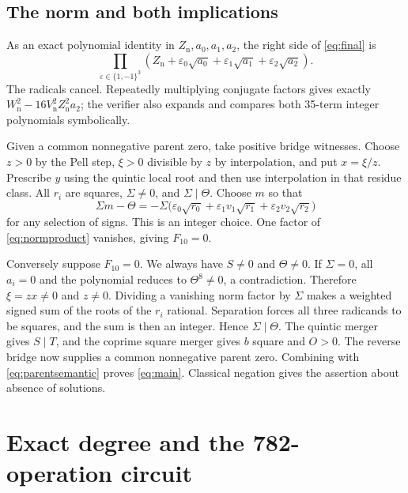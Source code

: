 \documentclass[11pt]{article}
\theoremstyle{definition}
\theoremstyle{remark}
\numberwithin{equation}{section}
\begin{document}
\subsection{The norm and both implications}

As an exact polynomial identity in \(Z_{\mathrm n},a_0,a_1,a_2\),
the right side of \eqref{eq:final} is
\begin{equation}\label{eq:normproduct}
 \prod_{\varepsilon\in\{1,-1\}^3}
 \left(Z_{\mathrm n}+\varepsilon_0\sqrt{a_0}
                     +\varepsilon_1\sqrt{a_1}
                     +\varepsilon_2\sqrt{a_2}\right).
\end{equation}
The radicals cancel. Repeatedly multiplying conjugate factors gives
exactly \(W_{\mathrm n}^2-16V_{\mathrm n}^2Z_{\mathrm n}^2a_2\);
the verifier also expands and compares both 35-term integer
polynomials symbolically.

Given a common nonnegative parent zero, take positive bridge witnesses.
Choose \(z>0\) by the Pell step, \(\xi>0\) divisible by \(z\) by
interpolation, and put \(x=\xi/z\). Prescribe \(y\) using the quintic
local root and then use interpolation in that residue class.
All \(r_i\) are squares, \(\Sigma\ne0\), and \(\Sigma\mid\Theta\).
Choose \(m\) so that
\[
 \Sigma m-\Theta
 =-\Sigma\bigl(\varepsilon_0\sqrt{r_0}
               +\varepsilon_1v_1\sqrt{r_1}
               +\varepsilon_2v_2\sqrt{r_2}\bigr)
\]
for any selection of signs. This is an integer choice.
One factor of \eqref{eq:normproduct} vanishes, giving \(F_{10}=0\).

Conversely suppose \(F_{10}=0\). We always have \(S\ne0\) and
\(\Theta\ne0\). If \(\Sigma=0\), all \(a_i=0\) and the polynomial
reduces to \(\Theta^8\ne0\), a contradiction. Therefore
\(\xi=zx\ne0\) and \(z\ne0\).
Dividing a vanishing norm factor by \(\Sigma\) makes a weighted signed
sum of the roots of the \(r_i\) rational. Separation forces all three
radicands to be squares, and the sum is then an integer. Hence
\(\Sigma\mid\Theta\). The quintic merger gives \(S\mid T\), and the
coprime square merger gives \(b\) square and \(O>0\).
The reverse bridge now supplies a common nonnegative parent zero.
Combining with \eqref{eq:parentsemantic} proves \eqref{eq:main}.
Classical negation gives the assertion about absence of solutions.

\section{Exact degree and the 782-operation circuit}
\label{sec:degree}
\end{document}
